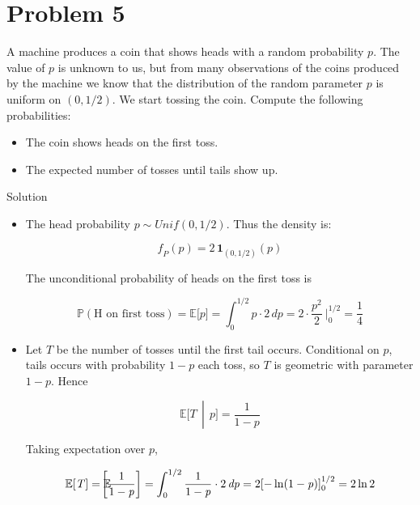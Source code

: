 \section{Problem 5}\label{hw03-problem-5}

A machine produces a coin that shows heads with a random probability \(\mathit{p}\). The value of \(\mathit{p}\) is unknown to us, but from many observations of the coins produced by the machine we know that the distribution of the random parameter \(\mathit{p}\) is uniform on \((0,1/2)\). We start tossing the coin. Compute the following probabilities:

\begin{itemize}
\item
  The coin shows heads on the first toss.
\item
  The expected number of tosses until tails show up.
\end{itemize}

\begin{qlsolution}{Solution}

\begin{itemize}
\item
  The head probability \(\mathit{p} \sim Unif(0,1/2)\). Thus the density is:

  \[\mathit{f}_{\mathit{P}}(\mathit{p}) = 2\,\mathbf{1}_{(0,1/2)}(\mathit{p})\]

  The unconditional probability of heads on the first toss is

  \[\mathbb{P}(\text{H on first toss}) = \mathbb{E}\lbrack\mathit{p}\rbrack = \int_{0}^{1/2}\mathit{p} \cdot 2\,\mathit{d}\mathit{p} = 2 \cdot \frac{\mathit{p}^{2}}{2}\ |_{0}^{1/2} = \frac{1}{4}\]
\item
  Let \(\mathit{T}\) be the number of tosses until the first tail occurs. Conditional on \(\mathit{p}\), tails occurs with probability \(1 - \mathit{p}\) each toss, so \(\mathit{T}\) is geometric with parameter \(1 - \mathit{p}\). Hence

  \[\left. \mathbb{E}\lbrack\mathit{T}\, \middle| \,\mathit{p}\rbrack = \frac{1}{1 - \mathit{p}} \right.\]

  Taking expectation over \(\mathit{p}\),

  \[\mathbb{E}\lbrack\mathit{T}\rbrack = \mathbb{E}\mspace{-18mu}\left\lbrack \frac{1}{1 - \mathit{p}} \right\rbrack = \int_{0}^{1/2}\frac{1}{1 - \mathit{p}} \cdot 2\,\mathit{d}\mathit{p} = 2\lbrack - \ln(1 - \mathit{p})\rbrack_{0}^{1/2} = 2\ln 2\]
\end{itemize}

\end{qlsolution}

